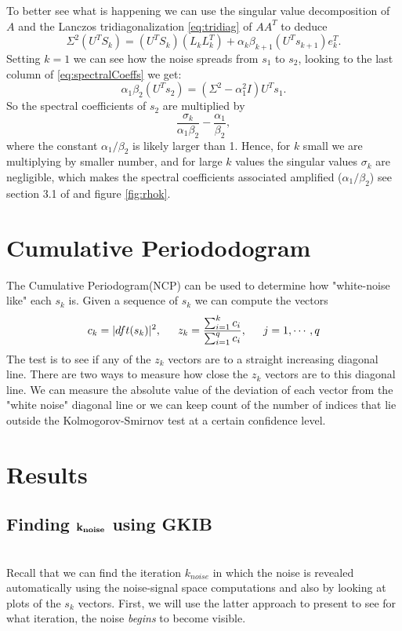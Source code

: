 \documentclass[11pt]{amsart}
\begin{document}
To better see what is happening we can use the singular value decomposition of
$A$ and the Lanczos tridiagonalization \eqref{eq:tridiag} of $AA^{T}$ to deduce
\begin{equation} \label{eq:spectralCoeffs}
  \Sigma^{2}(U^{T}S_{k}) = (U^{T}S_{k})(L_{k}L_{k}^{T}) + 
  \alpha_{k}\beta_{k+1}(U^{T}s_{k+1})e_{k}^{T}.
\end{equation}
Setting $k = 1$ we can see how the noise spreads from $s_{1}$ to $s_{2}$,
looking to the last column of \eqref{eq:spectralCoeffs} we get:
\begin{equation*}
  \alpha_{1}\beta_{2}(U^{T}s_{2}) = (\Sigma^{2} - \alpha_{1}^{2}I)U^{T}s_{1}.
\end{equation*}
So the spectral coefficients of $s_{2}$ are multiplied by
\begin{equation*}
  \frac{\sigma_{k}}{\alpha_{1}\beta_{2}} - \frac{\alpha_{1}}{\beta_{2}},
\end{equation*}
where the constant $\alpha_{1}/\beta_{2}$ is likely larger than 1. Hence, for 
$k$ small we are multiplying by smaller number, and for large $k$ values the
singular values $\sigma_{k}$ are negligible, which makes the spectral
coefficients associated amplified ($\alpha_{1}/\beta_{2}$) see section 3.1 of 
\cite{bidiagonalization} and figure \ref{fig:rhok}.


\section{Cumulative Periododogram}
The Cumulative Periodogram(NCP) can be used to determine how "white-noise like" 
each $s_k$ is. Given a sequence of $s_k$ we can compute the vectors
$$c_k = |dft(s_k)|^2, \indent z_k = \frac{\sum_{i=1}^k c_i}{ \sum_{i=1}^q c_i}, \indent j=1,\cdots, q$$ 
The test is to see if any of the $z_k$ vectors are to a straight increasing diagonal line. There are two 
ways to measure how close the $z_k$ vectors are to this diagonal line. We can measure the 
absolute value of the deviation of each vector from the "white noise" diagonal line or we can keep
count of the number of indices that lie outside the Kolmogorov-Smirnov test at a certain confidence 
level. 

\section{Results}

\subsection{Finding $\bf k_{noise}$ using GKIB} \indent \\
	Recall that we can find the iteration $k_{noise}$ in which the noise is revealed automatically
	using the noise-signal space computations and also by looking at plots of the $s_k$ vectors.
	First, we will use the latter approach to present to see for what iteration, the noise {\it begins}
    to become visible.
\end{document}
